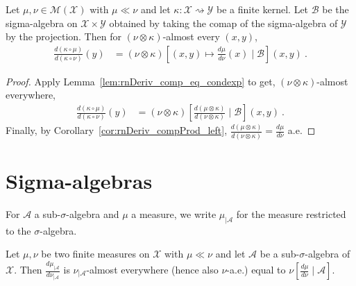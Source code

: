 \begin{lemma}
  \label{lem:rnDeriv_comp_eq_condexp_right}
  \uses{}
  Let $\mu, \nu \in \mathcal M(\mathcal X)$ with $\mu \ll \nu$ and let $\kappa : \mathcal X \rightsquigarrow \mathcal Y$ be a finite kernel.
  Let $\mathcal B$ be the sigma-algebra on $\mathcal X \times \mathcal Y$ obtained by taking the comap of the sigma-algebra of $\mathcal Y$ by the projection.
  Then for $(\nu \otimes \kappa)$-almost every $(x,y)$,
  \begin{align*}
  \frac{d(\kappa \circ \mu)}{d(\kappa \circ \nu)}(y)
  &= (\nu \otimes \kappa)\left[ (x, y) \mapsto \frac{d \mu}{d \nu}(x) \mid \mathcal B \right](x,y)
  \: .
  \end{align*}
  
\end{lemma}

\begin{proof}\leanok
{}
Apply Lemma~\ref{lem:rnDeriv_comp_eq_condexp} to get, $(\nu \otimes \kappa)$-almost everywhere,
\begin{align*}
\frac{d(\kappa \circ \mu)}{d(\kappa \circ \nu)}(y)
&= (\nu \otimes \kappa)\left[ \frac{d (\mu \otimes \kappa)}{d (\nu \otimes \kappa)} \mid \mathcal B\right](x,y)
\: .
\end{align*}
Finally, by Corollary~\ref{cor:rnDeriv_compProd_left}, $\frac{d (\mu \otimes \kappa)}{d (\nu \otimes \kappa)} = \frac{d \mu}{d \nu}$ a.e.
\end{proof}


\section{Sigma-algebras}

For $\mathcal A$ a sub-$\sigma$-algebra and $\mu$ a measure, we write $\mathcal \mu_{| \mathcal A}$ for the measure restricted to the $\sigma$-algebra.

\begin{lemma}
  \label{lem:rnDeriv_trim_of_ac}
  \mathlibok
  Let $\mu, \nu$ be two finite measures on $\mathcal X$ with $\mu \ll \nu$ and let $\mathcal A$ be a sub-$\sigma$-algebra of $\mathcal X$.
  Then $\frac{d \mu_{| \mathcal A}}{d \nu_{| \mathcal A}}$ is $\nu_{| \mathcal A}$-almost everywhere (hence also $\nu$-a.e.) equal to $\nu\left[ \frac{d \mu}{d \nu} \mid \mathcal A\right]$.
\end{lemma}

